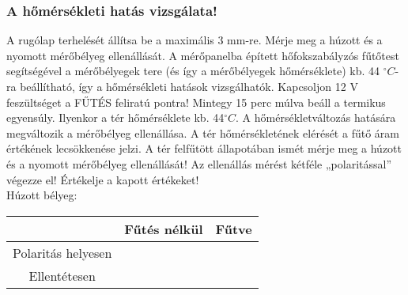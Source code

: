 \documentclass[10pt,a4paper]{article}
\begin{document}
	\subsubsection{A hőmérsékleti hatás vizsgálata!}
	A rugólap terhelését állítsa be a maximális 3 mm-re.
Mérje meg a húzott és a nyomott mérőbélyeg ellenállását.
A mérőpanelba épített hőfokszabályzós fűtőtest segítségével a mérőbélyegek tere (és így a
mérőbélyegek hőmérséklete) kb. 44 $^{\circ}C$-ra beállítható, így a hőmérsékleti hatások
vizsgálhatók.
Kapcsoljon 12 V feszültséget a FŰTÉS feliratú pontra!
Mintegy 15 perc múlva beáll a termikus egyensúly. Ilyenkor a tér hőmérséklete kb. 44$^{\circ}C$.
A hőmérsékletváltozás hatására megváltozik a mérőbélyeg ellenállása.
A tér hőmérsékletének elérését a fűtő áram értékének lecsökkenése jelzi.
A tér felfűtött állapotában ismét mérje meg a húzott és a nyomott mérőbélyeg ellenállását!
Az ellenállás mérést kétféle „polaritással” végezze el! Értékelje a kapott értékeket!
$$$$Húzott bélyeg:$$$$\begin{tabular}{|c|c|c|}
\hline 
 & Fűtés nélkül & Fűtve \\ 
\hline 
Polaritás helyesen &  &  \\ 
\hline 
Ellentétesen &  &  \\ 
\hline 
\end{tabular} 
\end{document}
